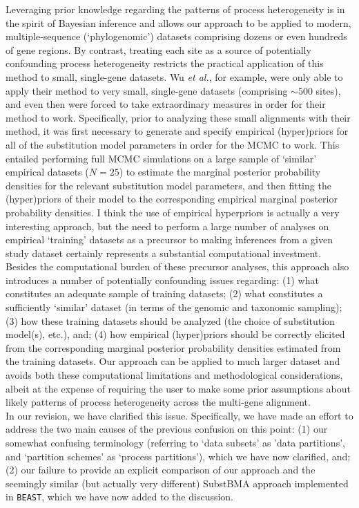 \documentclass[10pt]{article}
\begin{document}
\begin{flushleft}
\begin{enumerate}
{\smallskip
\noindent 
	Leveraging prior knowledge regarding the patterns of process heterogeneity is in the spirit of Bayesian inference and allows our approach to be applied to modern, multiple-sequence (`phylogenomic') datasets comprising dozens or even hundreds of gene regions.  
	By contrast, treating each site as a source of potentially confounding process heterogeneity restricts the practical application of this method to small, single-gene datasets.  
	Wu \textit{et al.}, for example, were only able to apply their method to very small, single-gene datasets (comprising $\sim 500$ sites), and even then were forced to take extraordinary measures in order for their method to work.
	Specifically, prior to analyzing these small alignments with their method, it was first necessary to generate and specify empirical (hyper)priors for all of the substitution model parameters in order for the MCMC to work.
	This entailed performing full MCMC simulations on a large sample of `similar' empirical datasets ($N = 25$) to estimate the marginal posterior probability densities for the relevant substitution model parameters, and then fitting the (hyper)priors of their model to the corresponding empirical marginal posterior probability densities.
	I think the use of empirical hyperpriors is actually a very interesting approach, but the need to perform a large number of analyses on empirical `training' datasets as a precursor to making inferences from a given study dataset certainly represents a substantial computational investment.
	Besides the computational burden of these precursor analyses, this approach also introduces a number of potentially confounding issues regarding: (1) what constitutes an adequate sample of training datasets; (2) what constitutes a sufficiently `similar' dataset (in terms of the genomic and taxonomic sampling); (3) how these training datasets should be analyzed (the choice of substitution model(s), etc.), and; (4) how empirical (hyper)priors should be correctly elicited from the corresponding marginal posterior probability densities estimated from the training datasets.
	Our approach can be applied to much larger dataset and avoids both these computational limitations and methodological considerations, albeit at the expense of requiring the user to make some prior assumptions about likely patterns of process heterogeneity across the multi-gene alignment.\\

\smallskip
\noindent 
	In our revision, we have clarified this issue.
	Specifically, we have made an effort to address the two main causes of the previous confusion on this point: 
	(1) our somewhat confusing terminology (referring to `data subsets' as 'data partitions', and `partition schemes' as `process partitions'), which we have now clarified, and; 
	(2) our failure to provide an explicit comparison of our approach and the seemingly similar (but actually very different) SubstBMA approach implemented in \texttt{BEAST}, which we have now added to the discussion.}


\end{enumerate}
\end{flushleft}
\end{document}
